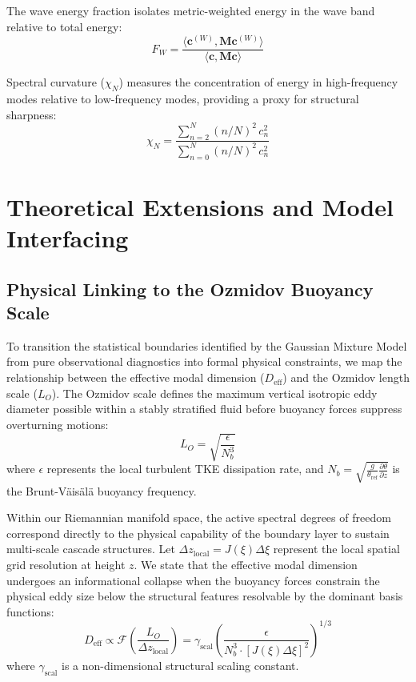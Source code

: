 \documentclass[11pt,a4paper]{article}
\begin{document}
The wave energy fraction isolates metric-weighted energy in the wave band relative to total energy:
\begin{equation}
F_W = \frac{\langle \mathbf{c}^{(W)}, \mathbf{M} \mathbf{c}^{(W)} \rangle}{\langle \mathbf{c}, \mathbf{M} \mathbf{c} \rangle}
\label{eq:f_w}
\end{equation}

Spectral curvature ($\chi_N$) measures the concentration of energy in high-frequency modes relative to low-frequency modes, providing a proxy for structural sharpness:
\begin{equation}
\chi_N = \frac{\sum_{n=2}^{N} (n/N)^2 \, c_n^2}{\sum_{n=0}^{N} (n/N)^2 \, c_n^2}
\label{eq:chi_n}
\end{equation}

\section{Theoretical Extensions and Model Interfacing}
\label{sec:extensions}

\subsection{Physical Linking to the Ozmidov Buoyancy Scale}
\label{sec:extensions:ozmidov}

To transition the statistical boundaries identified by the Gaussian Mixture Model from pure observational diagnostics into formal physical constraints, we map the relationship between the effective modal dimension ($D_{\mathrm{eff}}$) and the Ozmidov length scale ($L_O$). The Ozmidov scale defines the maximum vertical isotropic eddy diameter possible within a stably stratified fluid before buoyancy forces suppress overturning motions:
\begin{equation}
L_O = \sqrt{\frac{\epsilon}{N_b^3}}
\label{eq:ozmidov_def}
\end{equation}
where $\epsilon$ represents the local turbulent TKE dissipation rate, and $N_b = \sqrt{\frac{g}{\theta_{\mathrm{ref}}} \frac{\partial \theta}{\partial z}}$ is the Brunt-Väisälä buoyancy frequency.

Within our Riemannian manifold space, the active spectral degrees of freedom correspond directly to the physical capability of the boundary layer to sustain multi-scale cascade structures. Let $\Delta z_{\text{local}} = J(\xi) \Delta \xi$ represent the local spatial grid resolution at height $z$. We state that the effective modal dimension undergoes an informational collapse when the buoyancy forces constrain the physical eddy size below the structural features resolvable by the dominant basis functions:
\begin{equation}
D_{\mathrm{eff}} \propto \mathcal{F}\left(\frac{L_O}{\Delta z_{\text{local}}}\right) = \gamma_{\text{scal}} \left( \frac{\epsilon}{N_b^3 \cdot [J(\xi)\Delta \xi]^2} \right)^{1/3}
\label{eq:d_eff_ozmidov_link}
\end{equation}
where $\gamma_{\text{scal}}$ is a non-dimensional structural scaling constant.
\end{document}
